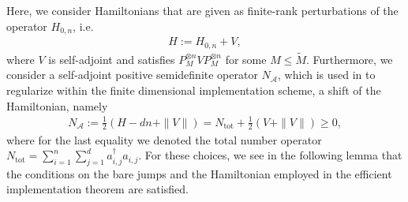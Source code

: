 \documentclass[11pt]{amsart}
\newcommand{\1}{\mathbbm{1}}
\newcommand{\NA}{N_{\mathcal{A}}}
\newcommand{\Ntot}{N_{\operatorname{tot}}}
\theoremstyle{plain}
\theoremstyle{definition}
\theoremstyle{remark}
\numberwithin{equation}{section}
\begin{document}
Here, we consider Hamiltonians that are given as finite-rank perturbations of the operator $H_{0,n}$, i.e.
\begin{align*}
    H:= H_{0,n} + V,
\end{align*}
where $V$ is self-adjoint and satisfies $P^{\otimes n}_M VP^{\otimes n}_M$ for some $M\le \widetilde M.$ Furthermore, we consider a self-adjoint positive semidefinite operator $\NA$, which is used in \cite{BeckerRouzeSalzmannToAppearcmp} to regularize within the finite dimensional implementation scheme, a shift of the Hamiltonian, namely
\begin{align*}
    \NA := \frac{1}{2}\left(H- dn + \|V\|\right) = \Ntot + \frac{1}{2}\left(V + \|V\|\right)   \ge 0,
\end{align*}
where for the last equality we denoted the total number operator $\Ntot = \sum_{i=1}^{n}\sum_{j=1}^d a^\dagger_{i,j}a_{i,j}.$
For these choices,  we see in the following lemma that the conditions on the bare jumps and the Hamiltonian employed in the efficient implementation theorem \cite[Theorem~4.12]{BeckerRouzeSalzmannToAppearcmp} are satisfied.
\end{document}
